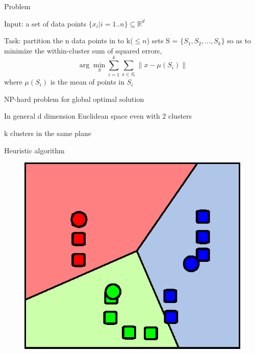 \documentclass[
nopagebreaks,
style=klope,
fleqn]{powerdot}
\begin{document}
\begin{slide} {Problem}
  \begin{compactitem}
  \item{Input: a set of data points $\{x_i|i = 1..n\} \subseteq
    \mathbb{R}^d $}
  \item{Task: partition the n data points
    in to k($\leq n$) sets S = $\{S_1, S_2, ..., S_k\}$ so as to minimize
    the within-cluster sum of squared
    errors, $$\arg\min_{S}\sum_{i=1}^{k}\sum_{x \in S_i} \parallel x -
    \mu(S_i)\parallel$$ where $\mu(S_i)$ is the mean of points in $S_i$}
  \item{NP-hard problem for global optimal solution
    \begin{compactitem}
    \item{In general d dimension Euclidean space even with 2 clusters~\cite{k-means-euclidean}}
    \item{k clusters in the same plane~\cite{k-means-plane}}
    \end{compactitem}
  }
  \item{Heuristic algorithm}
  \end{compactitem}
  \vspace{-0.6in}
  \begin{figure}
    \flushright
    \includegraphics[scale=.5]{fig/K_Means_Example_Step_4.eps}
  \end{figure}
\end{slide}
\end{document}
